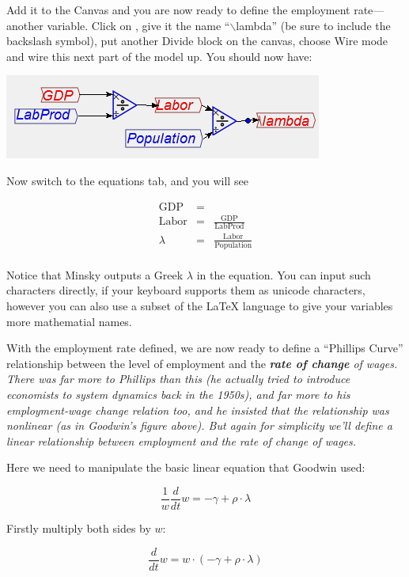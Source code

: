 Add it to the Canvas and you are now ready to define the employment
rate---another variable. Click on , give it
the name ``$\backslash$lambda'' (be sure to include the backslash
symbol), put another Divide block on the canvas, choose Wire mode
and wire this next part of the model up. You should now have:
\begin{center}
\includegraphics{images/NewItem83} 
\par\end{center}

Now switch to the equations tab, and you will see

\begin{eqnarray*}
\mathrm{GDP} & =\\
\mathrm{Labor} & = & \frac{\mathrm{GDP}}{\mathrm{LabProd}}\\
\lambda & = & \frac{\mathrm{Labor}}{\mathrm{Population}}\\
\end{eqnarray*}

Notice that Minsky outputs a Greek $\lambda$ in the equation. You
can input such characters directly, if your keyboard supports them
as unicode characters, however you can also use a subset of the LaTeX
language to give your variables more mathematial names.

With the employment rate defined, we are now ready to define a ``Phillips
Curve'' relationship between the level of employment and the {\em\textbf{rate
of change} of wages. There was far more to Phillips than this (he
actually tried to introduce economists to system dynamics back in
the 1950s), and far more to his employment-wage change relation too,
and he insisted that the relationship was nonlinear (as in Goodwin's
figure above). But again for simplicity we'll define a linear relationship
between employment and the rate of change of wages.}

Here we need to manipulate the basic linear equation that Goodwin
used:

\[
\frac{1}{w}\frac{d}{dt}w=-\gamma+\rho\cdot\lambda
\]

Firstly multiply both sides by $w$:

\[
\frac{d}{dt}w=w\cdot(-\gamma+\rho\cdot\lambda)
\]

